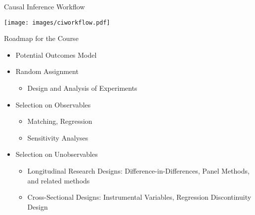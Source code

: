 \documentclass{beamer}
\numberwithin{equation}{section}
\begin{document}

\begin{frame}{Causal Inference Workflow}

\centering
  \texttt{[image: images/ciworkflow.pdf]}

\end{frame}

\begin{frame}{Roadmap for the Course}

\begin{itemize}
\item
  Potential Outcomes Model\smallskip
\item
  Random Assignment%
 \begin{itemize}
  \itemsep1pt\parskip0pt
  \item Design and Analysis of Experiments\smallskip

  \end{itemize}



\item
  Selection on Observables

  \begin{itemize}
  \itemsep1pt\parskip0pt
  \item
    Matching, Regression
  \item 
    Sensitivity Analyses\smallskip
  \end{itemize}
 
  \item
  Selection on Unobservables
  \begin{itemize}
  \itemsep1pt\parskip0pt
  \item
     Longitudinal Research Designs: Difference-in-Differences, Panel Methods, and related methods\smallskip
  \end{itemize}
  \begin{itemize}
  \itemsep1pt\parskip0pt
  \item
   Cross-Sectional Designs:  Instrumental Variables, Regression Discontinuity Design
  \end{itemize}


\end{itemize}
\end{frame}
\end{document}
